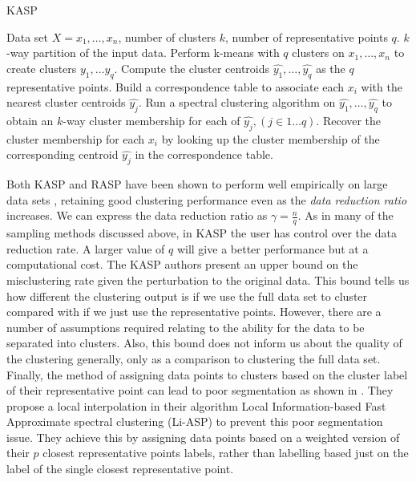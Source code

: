 \begin{algorithm}[h!]
\caption{KASP}
  \begin{algorithmic}[1]
   \REQUIRE Data set $X = {x_1,\ldots, x_n}$, number of clusters $k$, number of representative points $q$.
   \ENSURE  $k$-way partition of the input data.
   \STATE Perform k-means with $q$ clusters on $x_1, \hdots, x_n$ to create clusters $y_1, \hdots y_q$.
   \STATE Compute the cluster centroids $\widehat{y_1}, \hdots, \widehat{y_q}$ as the $q$ representative points.
   \STATE Build a correspondence table to associate each $x_i$ with the nearest cluster centroids $\widehat{y_j}$.
   \STATE Run a spectral clustering algorithm on $\widehat{y_1}, \hdots, \widehat{y_q}$ to obtain an $k$-way cluster membership
   for each of $\widehat{y_j}, (j \in 1 \hdots q)$.
   \STATE Recover the cluster membership for each $x_i$ by looking up the cluster membership of the corresponding centroid $\widehat{y_j}$ in the correspondence table.
  \end{algorithmic}
\label{alg:kasp}
\end{algorithm}

Both KASP and RASP have been shown to perform well empirically on large data sets \citep{Yan2009}, retaining good clustering performance even as the \textit{data reduction ratio} increases. We can express the data reduction ratio as $\gamma = \frac{n}{q}$. As in many of the sampling methods discussed above, in KASP the user has control over the data reduction rate. A larger value of $q$ will give a better performance but at a computational cost. The KASP authors present an upper bound on the misclustering rate given the perturbation to the original data. This bound tells us how different the clustering output is if we use the full data set to cluster compared with if we just use the representative points. However, there are a number of assumptions required \citep{Huang2008} relating to the ability for the data to be separated into clusters. Also, this bound does not inform us about the quality of the clustering generally, only as a comparison to clustering the full data set. Finally, the method of assigning data points to clusters based on the cluster label of their representative point can lead to poor segmentation as shown in \cite{Cao2014}. They propose a local interpolation in their algorithm Local Information-based Fast Approximate spectral clustering (Li-ASP) to prevent this poor segmentation issue. They achieve this by assigning data points based on a weighted version of their $p$ closest representative points labels, rather than labelling based just on the label of the single closest representative point. 
 
